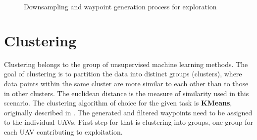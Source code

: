 \begin{figure}[!htb]
  \centering
  \caption{Downsampling and waypoint generation process for exploration}
  \label{fig:downsampling}
\end{figure}%


\section{Clustering}%
Clustering belongs to the group of unsupervised machine learning methods.
The goal of clustering is to partition the data into distinct groups (clusters), where data points within the same cluster are more similar to each other than to those in other clusters.
The euclidean distance is the measure of similarity used in this scenario.
The clustering algorithm of choice for the given task is \textbf{KMeans}, originally described in \cite{kmeans}.
The generated and filtered waypoints need to be assigned to the individual \ac{UAV}s. 
First step for that is clustering into groups, one group for each \ac{UAV} contributing to exploitation.

